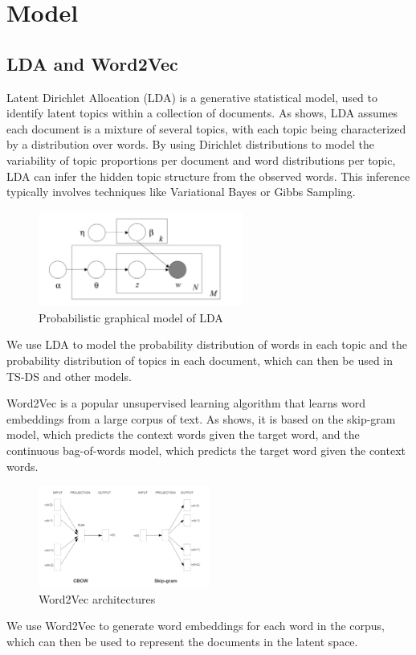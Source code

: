 \documentclass[UTF8]{ctexart}
\begin{document}
\section{Model}

\subsection{LDA and Word2Vec}
{
    Latent Dirichlet Allocation (LDA) \cite{ref5} is a generative statistical model, used to identify latent topics within a collection of documents. As  shows, LDA assumes each document is a mixture of several topics, with each topic being characterized by a distribution over words. By using Dirichlet distributions to model the variability of topic proportions per document and word distributions per topic, LDA can infer the hidden topic structure from the observed words. This inference typically involves techniques like Variational Bayes or Gibbs Sampling.

    \begin{figure}[htbp]
        \captionsetup{position=bottom, skip=8pt}
        \centering
        \includegraphics[width=0.6\textwidth]{LDA_1}
        \caption{Probabilistic graphical model of LDA}
        \label{fig:LDA_1}
    \end{figure}

    We use LDA to model the probability distribution of words in each topic and the probability distribution of topics in each document, which can then be used in TS-DS and other models.

    Word2Vec \cite{ref2} is a popular unsupervised learning algorithm that learns word embeddings from a large corpus of text. As  shows, it is based on the skip-gram model, which predicts the context words given the target word, and the continuous bag-of-words model, which predicts the target word given the context words.

    \begin{figure}[htbp]
        \captionsetup{position=bottom, skip=8pt}
        \centering
        \includegraphics[width=0.5\textwidth]{Word2Vec_1}
        \caption{Word2Vec architectures}
        \label{fig:Word2Vec_1}
    \end{figure}

    We use Word2Vec to generate word embeddings for each word in the corpus, which can then be used to represent the documents in the latent space.
}
\end{document}
